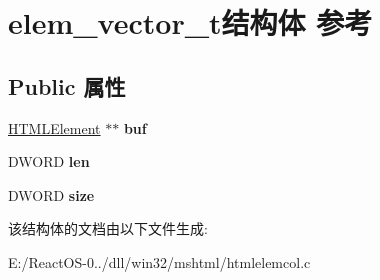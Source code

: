 \hypertarget{structelem__vector__t}{}\section{elem\+\_\+vector\+\_\+t结构体 参考}
\label{structelem__vector__t}
\subsection*{Public 属性}
\begin{DoxyCompactItemize}
\item 
\mbox{\label{structelem__vector__t_adc907a8c553cb062c5bef990a773f25d}} 
\hyperlink{struct_h_t_m_l_element}{H\+T\+M\+L\+Element} $\ast$$\ast$ {\bfseries buf}
\item 
\mbox{\label{structelem__vector__t_add0e5eccb6f4b8f50d7870f34c208e89}} 
D\+W\+O\+RD {\bfseries len}
\item 
\mbox{\label{structelem__vector__t_a47987357e1f37768357070d584262c18}} 
D\+W\+O\+RD {\bfseries size}
\end{DoxyCompactItemize}


该结构体的文档由以下文件生成\+:\begin{DoxyCompactItemize}
\item 
E\+:/\+React\+O\+S-\/0../dll/win32/mshtml/htmlelemcol.\+c\end{DoxyCompactItemize}
